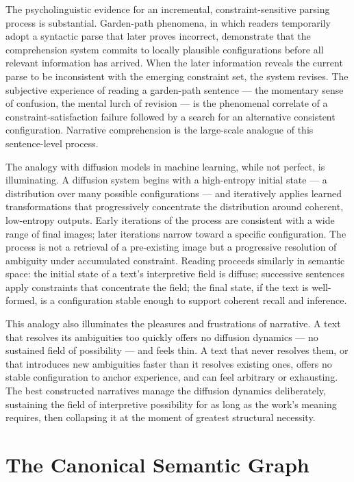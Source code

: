 \documentclass[12pt, a4paper]{article}
\begin{document}
The psycholinguistic evidence for an incremental, constraint-sensitive parsing process is substantial. Garden-path phenomena, in which readers temporarily adopt a syntactic parse that later proves incorrect, demonstrate that the comprehension system commits to locally plausible configurations before all relevant information has arrived. When the later information reveals the current parse to be inconsistent with the emerging constraint set, the system revises. The subjective experience of reading a garden-path sentence — the momentary sense of confusion, the mental lurch of revision — is the phenomenal correlate of a constraint-satisfaction failure followed by a search for an alternative consistent configuration. Narrative comprehension is the large-scale analogue of this sentence-level process.

The analogy with diffusion models in machine learning, while not perfect, is illuminating. A diffusion system begins with a high-entropy initial state — a distribution over many possible configurations — and iteratively applies learned transformations that progressively concentrate the distribution around coherent, low-entropy outputs. Early iterations of the process are consistent with a wide range of final images; later iterations narrow toward a specific configuration. The process is not a retrieval of a pre-existing image but a progressive resolution of ambiguity under accumulated constraint. Reading proceeds similarly in semantic space: the initial state of a text's interpretive field is diffuse; successive sentences apply constraints that concentrate the field; the final state, if the text is well-formed, is a configuration stable enough to support coherent recall and inference.

This analogy also illuminates the pleasures and frustrations of narrative. A text that resolves its ambiguities too quickly offers no diffusion dynamics — no sustained field of possibility — and feels thin. A text that never resolves them, or that introduces new ambiguities faster than it resolves existing ones, offers no stable configuration to anchor experience, and can feel arbitrary or exhausting. The best constructed narratives manage the diffusion dynamics deliberately, sustaining the field of interpretive possibility for as long as the work's meaning requires, then collapsing it at the moment of greatest structural necessity.

\section{The Canonical Semantic Graph}
\end{document}
